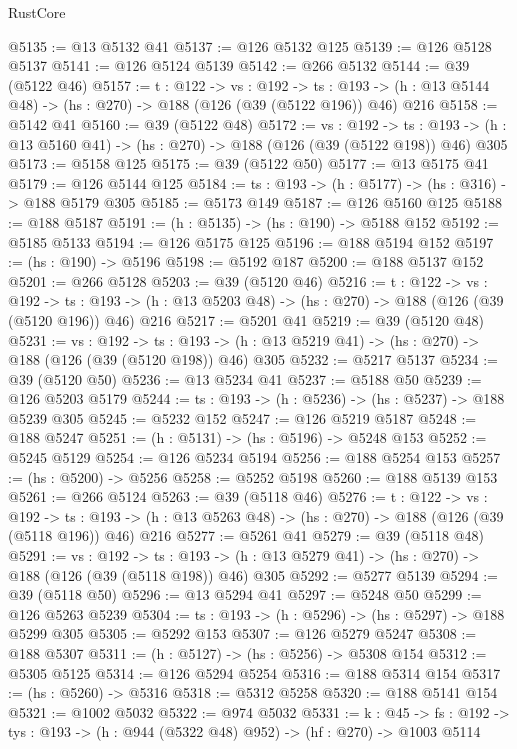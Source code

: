 \begin{lexlean}{RustCore}
\begin{coremodule}
@5135 := @13 @5132 @41
@5137 := @126 @5132 @125
@5139 := @126 @5128 @5137
@5141 := @126 @5124 @5139
@5142 := @266 @5132
@5144 := @39 (@5122 @46)
@5157 := {t : @122} ->
  {vs : @192} ->
  {ts : @193} -> (h : @13 @5144 @48) -> (hs : @270) -> @188 (@126 (@39 (@5122 @196)) @46) @216
@5158 := @5142 @41
@5160 := @39 (@5122 @48)
@5172 := {vs : @192} ->
  {ts : @193} -> (h : @13 @5160 @41) -> (hs : @270) -> @188 (@126 (@39 (@5122 @198)) @46) @305
@5173 := @5158 @125
@5175 := @39 (@5122 @50)
@5177 := @13 @5175 @41
@5179 := @126 @5144 @125
@5184 := {ts : @193} -> (h : @5177) -> (hs : @316) -> @188 @5179 @305
@5185 := @5173 @149
@5187 := @126 @5160 @125
@5188 := @188 @5187
@5191 := (h : @5135) -> (hs : @190) -> @5188 @152
@5192 := @5185 @5133
@5194 := @126 @5175 @125
@5196 := @188 @5194 @152
@5197 := (hs : @190) -> @5196
@5198 := @5192 @187
@5200 := @188 @5137 @152
@5201 := @266 @5128
@5203 := @39 (@5120 @46)
@5216 := {t : @122} ->
  {vs : @192} ->
  {ts : @193} -> (h : @13 @5203 @48) -> (hs : @270) -> @188 (@126 (@39 (@5120 @196)) @46) @216
@5217 := @5201 @41
@5219 := @39 (@5120 @48)
@5231 := {vs : @192} ->
  {ts : @193} -> (h : @13 @5219 @41) -> (hs : @270) -> @188 (@126 (@39 (@5120 @198)) @46) @305
@5232 := @5217 @5137
@5234 := @39 (@5120 @50)
@5236 := @13 @5234 @41
@5237 := @5188 @50
@5239 := @126 @5203 @5179
@5244 := {ts : @193} -> (h : @5236) -> (hs : @5237) -> @188 @5239 @305
@5245 := @5232 @152
@5247 := @126 @5219 @5187
@5248 := @188 @5247
@5251 := (h : @5131) -> (hs : @5196) -> @5248 @153
@5252 := @5245 @5129
@5254 := @126 @5234 @5194
@5256 := @188 @5254 @153
@5257 := (hs : @5200) -> @5256
@5258 := @5252 @5198
@5260 := @188 @5139 @153
@5261 := @266 @5124
@5263 := @39 (@5118 @46)
@5276 := {t : @122} ->
  {vs : @192} ->
  {ts : @193} -> (h : @13 @5263 @48) -> (hs : @270) -> @188 (@126 (@39 (@5118 @196)) @46) @216
@5277 := @5261 @41
@5279 := @39 (@5118 @48)
@5291 := {vs : @192} ->
  {ts : @193} -> (h : @13 @5279 @41) -> (hs : @270) -> @188 (@126 (@39 (@5118 @198)) @46) @305
@5292 := @5277 @5139
@5294 := @39 (@5118 @50)
@5296 := @13 @5294 @41
@5297 := @5248 @50
@5299 := @126 @5263 @5239
@5304 := {ts : @193} -> (h : @5296) -> (hs : @5297) -> @188 @5299 @305
@5305 := @5292 @153
@5307 := @126 @5279 @5247
@5308 := @188 @5307
@5311 := (h : @5127) -> (hs : @5256) -> @5308 @154
@5312 := @5305 @5125
@5314 := @126 @5294 @5254
@5316 := @188 @5314 @154
@5317 := (hs : @5260) -> @5316
@5318 := @5312 @5258
@5320 := @188 @5141 @154
@5321 := @1002 @5032
@5322 := @974 @5032
@5331 := {k : @45} ->
  {fs : @192} -> {tys : @193} -> (h : @944 (@5322 @48) @952) -> (hf : @270) -> @1003 @5114

\end{coremodule}
\end{lexlean}
